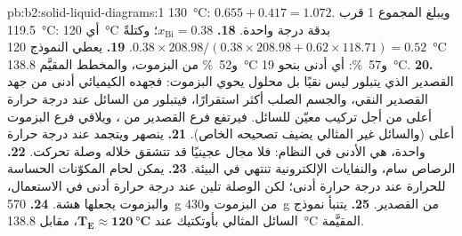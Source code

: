 \begin{solution}{pb:b2:solid-liquid-diagrams:1}
\qty{130}{\degreeCelsius}: $0.655 + 0.417 = 1.072$. ويبلغ المجموع 1 قرب
\qty{119.5}{\degreeCelsius}: أي \qty{120}{\degreeCelsius} بدقة درجة واحدة.
\textbf{18.} $x_{\mathrm{Bi}} = 0.38$؛ وكتلةً $0.38 \times 208.98/(0.38 \times
208.98 + 0.62 \times 118.71) = 0.52$.
\textbf{19.} يعطي النموذج \qty{120}{\degreeCelsius} و52~\% من البزموت، والمخطط
المقيَّم \qty{138.8}{\degreeCelsius} و57~\%: أي أدنى بنحو
\qty{19}{\degreeCelsius}.
\textbf{20.} القصدير الذي يتبلور ليس نقيًا بل محلول يحوي
البزموت: فجهده الكيميائي أدنى من جهد القصدير النقي، والجسم الصلب
أكثر استقرارًا، فيتبلور من السائل عند درجة حرارة أعلى من أجل
تركيب معيّن للسائل. فيرتفع فرع القصدير من ، ويلاقي
فرع البزموت أعلى (والسائل غير المثالي يضيف تصحيحه الخاص).
\textbf{21.} ينصهر ويتجمد عند درجة حرارة واحدة، هي الأدنى في النظام:
فلا مجال عجينيًا قد تتشقق خلاله وصلة تحركت.
\textbf{22.} الرصاص سام، والنفايات الإلكترونية تنتهي في البيئة.
\textbf{23.} يمكن لحام المكوّنات الحساسة للحرارة عند درجة حرارة أدنى؛
لكن الوصلة تلين عند درجة حرارة أدنى في الاستعمال، والبزموت يجعلها
هشة.
\textbf{24.} \qty{570}{g} من البزموت و\qty{430}{g} من القصدير.
\textbf{25.} يتنبأ نموذج السائل المثالي بأوتكتيك عند $\boldsymbol{T_E
\approx \qty{120}{\degreeCelsius}}$، مقابل \qty{138.8}{\degreeCelsius}
المقيَّمة.
\end{solution}
